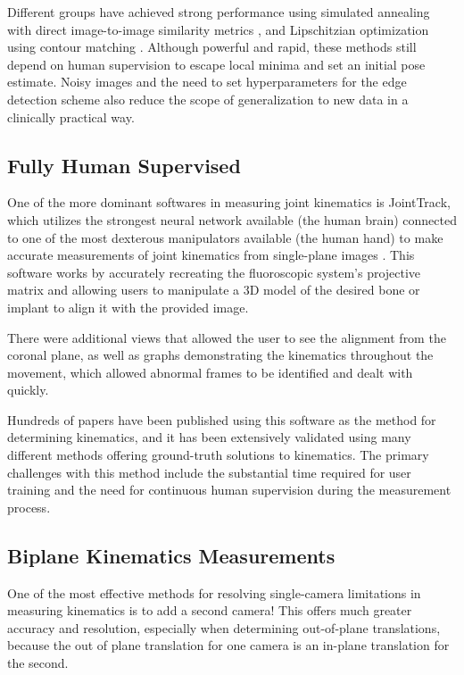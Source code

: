 Different groups have achieved strong performance using simulated annealing with direct image-to-image similarity metrics \cite{mahfouzRobustMethodRegistration2003}, and Lipschitzian optimization using contour matching \cite{floodAutomatedRegistration3D2018}.
Although powerful and rapid, these methods still depend on human supervision to escape local minima and set an initial pose estimate.
Noisy images and the need to set hyperparameters for the edge detection scheme also reduce the scope of generalization to new data in a clinically practical way.


\subsection{Fully Human Supervised}

One of the more dominant softwares in measuring joint kinematics is JointTrack, which utilizes the strongest neural network available (the human brain) connected to one of the most dexterous manipulators available (the human hand) to make accurate measurements of joint kinematics from single-plane images \cite{muJointTrackOpenSourceEasily2007}.
This software works by accurately recreating the fluoroscopic system's projective matrix and allowing users to manipulate a 3D model of the desired bone or implant to align it with the provided image.

There were additional views that allowed the user to see the alignment from the coronal plane, as well as graphs demonstrating the kinematics throughout the movement, which allowed abnormal frames to be identified and dealt with quickly. 

Hundreds of papers have been published using this software as the method for determining kinematics, and it has been extensively validated using many different methods offering ground-truth solutions to kinematics.
The primary challenges with this method include the substantial time required for user training and the need for continuous human supervision during the measurement process.

\subsection{Biplane Kinematics Measurements}

One of the most effective methods for resolving single-camera limitations in measuring kinematics is to add a second camera!
This offers much greater accuracy and resolution, especially when determining out-of-plane translations, because the out of plane translation for one camera is an in-plane translation for the second.

